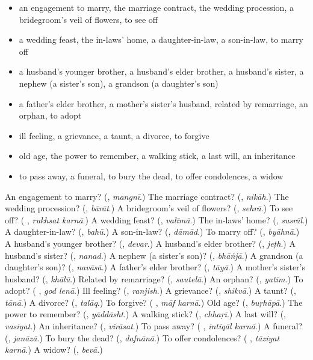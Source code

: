 \begin{itemize}
\raggedright
  \item an engagement to marry, the marriage contract, the wedding procession, a bridegroom's veil of flowers, to see off
  \item a wedding feast, the in-laws' home, a daughter-in-law, a son-in-law, to marry off
  \item a husband's younger brother, a husband's elder brother, a husband's sister, a nephew (a sister's son), a grandson (a daughter's son)
  \item a father's elder brother, a mother's sister's husband, related by remarriage, an orphan, to adopt
  \item ill feeling, a grievance, a taunt, a divorce, to forgive
  \item old age, the power to remember, a walking stick, a last will, an inheritance
  \item to pass away, a funeral, to bury the dead, to offer condolences, a widow
\end{itemize}

\begin{tcolorbox}[breakable,colback=teal!4,colframe=teal!35!black,title={Before you move on}]
An engagement to marry? (\textbf{}, \emph{mangnī}.) The marriage contract? (\textbf{}, \emph{nikāh}.) The wedding procession? (\textbf{}, \emph{bārāt}.) A bridegroom's veil of flowers? (\textbf{}, \emph{sehrā}.) To see off? (\textbf{ }, \emph{rukhsat karnā}.) A wedding feast? (\textbf{}, \emph{valīmā}.) The in-laws' home? (\textbf{}, \emph{susrāl}.) A daughter-in-law? (\textbf{}, \emph{bahū}.) A son-in-law? (\textbf{}, \emph{dāmād}.) To marry off? (\textbf{}, \emph{byāhnā}.) A husband's younger brother? (\textbf{}, \emph{devar}.) A husband's elder brother? (\textbf{}, \emph{jeṭh}.) A husband's sister? (\textbf{}, \emph{nanad}.) A nephew (a sister's son)? (\textbf{}, \emph{bhāṅjā}.) A grandson (a daughter's son)? (\textbf{}, \emph{navāsā}.) A father's elder brother? (\textbf{}, \emph{tāyā}.) A mother's sister's husband? (\textbf{}, \emph{khālū}.) Related by remarriage? (\textbf{}, \emph{sautelā}.) An orphan? (\textbf{}, \emph{yatīm}.) To adopt? (\textbf{ }, \emph{god lenā}.) Ill feeling? (\textbf{}, \emph{ranjish}.) A grievance? (\textbf{}, \emph{shikvā}.) A taunt? (\textbf{}, \emph{tānā}.) A divorce? (\textbf{}, \emph{talāq}.) To forgive? (\textbf{ }, \emph{māf karnā}.) Old age? (\textbf{}, \emph{buṛhāpā}.) The power to remember? (\textbf{}, \emph{yāddāsht}.) A walking stick? (\textbf{}, \emph{chhaṛī}.) A last will? (\textbf{}, \emph{vasiyat}.) An inheritance? (\textbf{}, \emph{virāsat}.) To pass away? (\textbf{ }, \emph{intiqāl karnā}.) A funeral? (\textbf{}, \emph{janāzā}.) To bury the dead? (\textbf{}, \emph{dafnānā}.) To offer condolences? (\textbf{ }, \emph{tāziyat karnā}.) A widow? (\textbf{}, \emph{bevā}.)
\end{tcolorbox}

